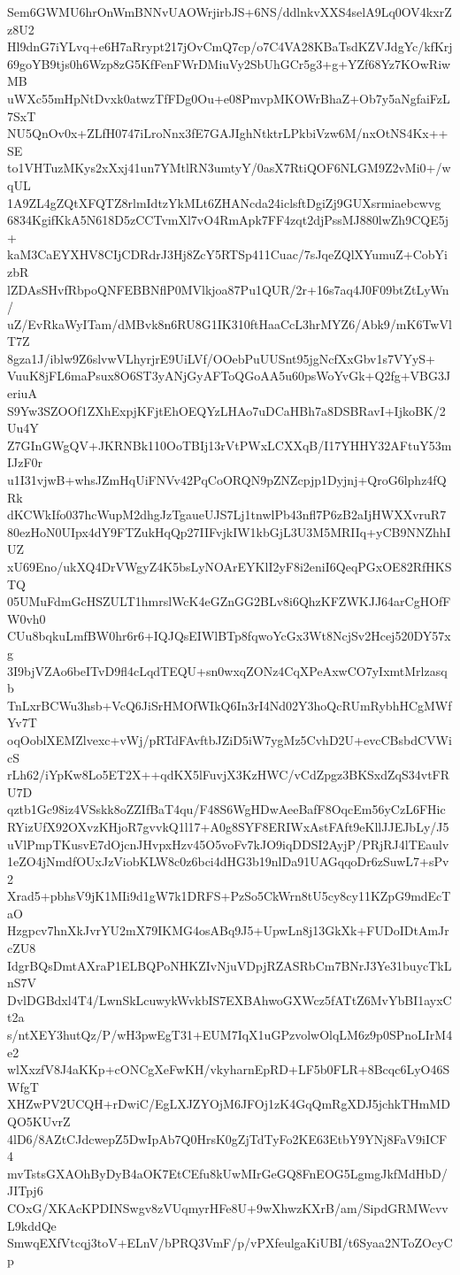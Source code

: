 Sem6GWMU6hrOnWmBNNvUAOWrjirbJS+6NS/ddlnkvXXS4selA9Lq0OV4kxrZz8U2
Hl9dnG7iYLvq+e6H7aRrypt217jOvCmQ7cp/o7C4VA28KBaTsdKZVJdgYc/kfKrj
69goYB9tjs0h6Wzp8zG5KfFenFWrDMiuVy2SbUhGCr5g3+g+YZf68Yz7KOwRiwMB
uWXc55mHpNtDvxk0atwzTfFDg0Ou+e08PmvpMKOWrBhaZ+Ob7y5aNgfaiFzL7SxT
NU5QnOv0x+ZLfH0747iLroNnx3fE7GAJIghNtktrLPkbiVzw6M/nxOtNS4Kx++SE
to1VHTuzMKys2xXxj41un7YMtlRN3umtyY/0asX7RtiQOF6NLGM9Z2vMi0+/wqUL
1A9ZL4gZQtXFQTZ8rlmIdtzYkMLt6ZHANcda24iclsftDgiZj9GUXsrmiaebcwvg
6834KgifKkA5N618D5zCCTvmXl7vO4RmApk7FF4zqt2djPssMJ880lwZh9CQE5j+
kaM3CaEYXHV8CIjCDRdrJ3Hj8ZcY5RTSp411Cuac/7sJqeZQlXYumuZ+CobYizbR
lZDAsSHvfRbpoQNFEBBNflP0MVlkjoa87Pu1QUR/2r+16s7aq4J0F09btZtLyWn/
uZ/EvRkaWyITam/dMBvk8n6RU8G1IK310ftHaaCcL3hrMYZ6/Abk9/mK6TwVlT7Z
8gza1J/iblw9Z6slvwVLhyrjrE9UiLVf/OOebPuUUSnt95jgNcfXxGbv1s7VYyS+
VuuK8jFL6maPsux8O6ST3yANjGyAFToQGoAA5u60psWoYvGk+Q2fg+VBG3JeriuA
S9Yw3SZOOf1ZXhExpjKFjtEhOEQYzLHAo7uDCaHBh7a8DSBRavI+IjkoBK/2Uu4Y
Z7GInGWgQV+JKRNBk110OoTBIj13rVtPWxLCXXqB/I17YHHY32AFtuY53mIJzF0r
u1I31vjwB+whsJZmHqUiFNVv42PqCoORQN9pZNZcpjp1Dyjnj+QroG6lphz4fQRk
dKCWkIfo037hcWupM2dhgJzTgaueUJS7Lj1tnwlPb43nfl7P6zB2aIjHWXXvruR7
80ezHoN0UIpx4dY9FTZukHqQp27IIFvjkIW1kbGjL3U3M5MRIIq+yCB9NNZhhIUZ
xU69Eno/ukXQ4DrVWgyZ4K5bsLyNOArEYKlI2yF8i2eniI6QeqPGxOE82RfHKSTQ
05UMuFdmGcHSZULT1hmrslWcK4eGZnGG2BLv8i6QhzKFZWKJJ64arCgHOfFW0vh0
CUu8bqkuLmfBW0hr6r6+IQJQsEIWlBTp8fqwoYcGx3Wt8NcjSv2Hcej520DY57xg
3I9bjVZAo6beITvD9fl4cLqdTEQU+sn0wxqZONz4CqXPeAxwCO7yIxmtMrlzasqb
TnLxrBCWu3hsb+VcQ6JiSrHMOfWIkQ6In3rI4Nd02Y3hoQcRUmRybhHCgMWfYv7T
oqOoblXEMZlvexc+vWj/pRTdFAvftbJZiD5iW7ygMz5CvhD2U+evcCBsbdCVWicS
rLh62/iYpKw8Lo5ET2X++qdKX5lFuvjX3KzHWC/vCdZpgz3BKSxdZqS34vtFRU7D
qztb1Gc98iz4VSskk8oZZIfBaT4qu/F48S6WgHDwAeeBafF8OqcEm56yCzL6FHic
RYizUfX92OXvzKHjoR7gvvkQ1l17+A0g8SYF8ERIWxAstFAft9eKllJJEJbLy/J5
uVlPmpTKusvE7dOjcnJHvpxHzv45O5voFv7kJO9iqDDSI2AyjP/PRjRJ4lTEaulv
1eZO4jNmdfOUxJzViobKLW8c0z6bci4dHG3b19nlDa91UAGqqoDr6zSuwL7+sPv2
Xrad5+pbhsV9jK1MIi9d1gW7k1DRFS+PzSo5CkWrn8tU5cy8cy11KZpG9mdEcTaO
Hzgpcv7hnXkJvrYU2mX79IKMG4osABq9J5+UpwLn8j13GkXk+FUDoIDtAmJrcZU8
IdgrBQsDmtAXraP1ELBQPoNHKZIvNjuVDpjRZASRbCm7BNrJ3Ye31buycTkLnS7V
DvlDGBdxl4T4/LwnSkLcuwykWvkbIS7EXBAhwoGXWcz5fATtZ6MvYbBI1ayxCt2a
s/ntXEY3hutQz/P/wH3pwEgT31+EUM7IqX1uGPzvolwOlqLM6z9p0SPnoLIrM4e2
wlXxzfV8J4aKKp+cONCgXeFwKH/vkyharnEpRD+LF5b0FLR+8Bcqc6LyO46SWfgT
XHZwPV2UCQH+rDwiC/EgLXJZYOjM6JFOj1zK4GqQmRgXDJ5jchkTHmMDQO5KUvrZ
4lD6/8AZtCJdcwepZ5DwIpAb7Q0HrsK0gZjTdTyFo2KE63EtbY9YNj8FaV9iICF4
mvTstsGXAOhByDyB4aOK7EtCEfu8kUwMIrGeGQ8FnEOG5LgmgJkfMdHbD/JITpj6
COxG/XKAcKPDINSwgv8zVUqmyrHFe8U+9wXhwzKXrB/am/SipdGRMWcvvL9kddQe
SmwqEXfVtcqj3toV+ELnV/bPRQ3VmF/p/vPXfeulgaKiUBI/t6Syaa2NToZOcyCp
